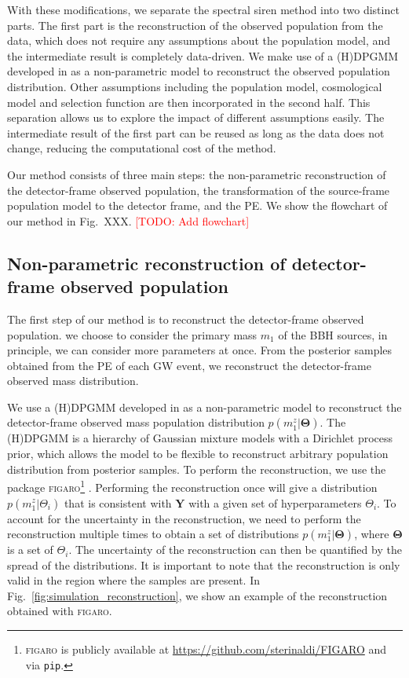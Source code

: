 \documentclass[aps,prd,twocolumn,superscriptaddress,preprintnumbers,nofootinbib,hidelinks]{revtex4-2}
\newcommand{\todo}[1]{\textcolor{red}{[TODO: #1]}}
\begin{document}
With these modifications, we separate the spectral siren method into two distinct parts.
The first part is the reconstruction of the observed population from the data, which does not require any assumptions about the population model, and the intermediate result is completely data-driven.
We make use of a \ac{(H)DPGMM} developed in \citet{Rinaldi:2021bhm} as a non-parametric model to reconstruct the observed population distribution.
Other assumptions including the population model, cosmological model and selection function are then incorporated in the second half.
This separation allows us to explore the impact of different assumptions easily.
The intermediate result of the first part can be reused as long as the data does not change, reducing the computational cost of the method.

Our method consists of three main steps: the non-parametric reconstruction of the detector-frame observed population, the transformation of the source-frame population model to the detector frame, and the \ac{PE}.
We show the flowchart of our method in Fig.~XXX. \todo{Add flowchart}

\subsection{Non-parametric reconstruction of detector-frame observed population}
\label{sec:reconstruction}

The first step of our method is to reconstruct the detector-frame observed population.
we choose to consider the primary mass $m_1$ of the \ac{BBH} sources, in principle, we can consider more parameters at once.
From the posterior samples obtained from the \ac{PE} of each \ac{GW} event, we reconstruct the detector-frame observed mass distribution.

We use a \ac{(H)DPGMM} developed in \citet{Rinaldi:2021bhm} as a non-parametric model to reconstruct the detector-frame observed mass population distribution $p(m^z_1|\mathbf{\Theta})$.
The \ac{(H)DPGMM} is a hierarchy of Gaussian mixture models with a Dirichlet process prior, which allows the model to be flexible to reconstruct arbitrary population distribution from posterior samples.
To perform the reconstruction, we use the package \textsc{figaro}\footnote{\textsc{figaro} is publicly available at \url{https://github.com/sterinaldi/FIGARO} and via \texttt{pip}.} \citep{Rinaldi:2024eep}.
Performing the reconstruction once will give a distribution $p(m^z_1|\Theta_i)$ that is consistent with $\mathbf{Y}$ with a given set of hyperparameters $\Theta_i$.
To account for the uncertainty in the reconstruction, we need to perform the reconstruction multiple times to obtain a set of distributions $p(m^z_1|\mathbf{\Theta})$, where $\mathbf{\Theta}$ is a set of $\Theta_i$.
The uncertainty of the reconstruction can then be quantified by the spread of the distributions.
It is important to note that the reconstruction is only valid in the region where the samples are present.
In Fig.~\ref{fig:simulation_reconstruction}, we show an example of the reconstruction obtained with \textsc{figaro}.
\end{document}
